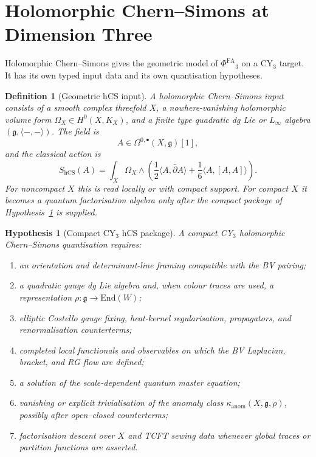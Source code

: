 \documentclass[11pt]{article}
\newtheorem{definition}[theorem]{Definition}
\newtheorem{hypothesis}[theorem]{Hypothesis}
\providecommand{\hCS}{\mathrm{hCS}}
\providecommand{\fg}{\mathfrak{g}}
\providecommand{\Dolb}{\bar\partial}
\providecommand{\kanom}{\kappa_{\mathrm{anom}}}
\providecommand{\PhiFA}{\Phi^{\mathrm{FA}}{}}
\begin{document}
\section{Holomorphic Chern--Simons at Dimension Three}

Holomorphic Chern--Simons gives the geometric model of
$\PhiFA_3$ on a CY$_3$ target.  It has its own typed input data and its
own quantisation hypotheses.

\begin{definition}[Geometric hCS input]
\label{def:hcs-input}
A holomorphic Chern--Simons input consists of a smooth complex threefold
$X$, a nowhere-vanishing holomorphic volume form
$\Omega_X\in H^0(X,K_X)$, and a finite type quadratic dg Lie or
$L_\infty$ algebra $(\fg,\langle-,-\rangle)$.  The field is
\[
 A\in \Omega^{0,\bullet}(X,\fg)[1],
\]
and the classical action is
\[
 S_{\hCS}(A)
 =
 \int_X \Omega_X\wedge
 \left(
  \frac12\langle A,\Dolb A\rangle
  +\frac16\langle A,[A,A]\rangle
 \right).
\]
For noncompact $X$ this is read locally or with compact support.  For
compact $X$ it becomes a quantum factorisation algebra only after the
compact package of Hypothesis~\ref{hyp:compact-hcs-package} is supplied.
\end{definition}

\begin{hypothesis}[Compact CY$_3$ hCS package]
\label{hyp:compact-hcs-package}
A compact CY$_3$ holomorphic Chern--Simons quantisation requires:
\begin{enumerate}[label=\textup{(\roman*)}]
 \item an orientation and determinant-line framing compatible with the
 BV pairing;
 \item a quadratic gauge dg Lie algebra and, when colour traces are
 used, a representation $\rho\colon\fg\to\mathrm{End}(W)$;
 \item elliptic Costello gauge fixing, heat-kernel regularisation,
 propagators, and renormalisation counterterms;
 \item completed local functionals and observables on which the BV
 Laplacian, bracket, and RG flow are defined;
 \item a solution of the scale-dependent quantum master equation;
 \item vanishing or explicit trivialisation of the anomaly class
 $\kanom(X,\fg,\rho)$, possibly after open--closed counterterms;
 \item factorisation descent over $X$ and TCFT sewing data whenever
 global traces or partition functions are asserted.
\end{enumerate}
\end{hypothesis}
\end{document}
